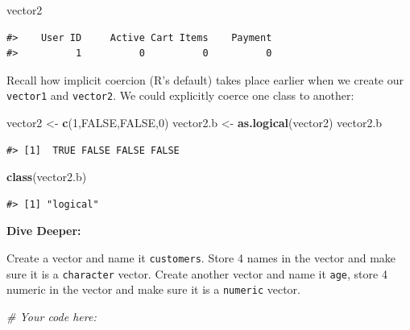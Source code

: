 \documentclass[]{article}
\newenvironment{Shaded}{\begin{snugshade}}{\end{snugshade}}
\newcommand{\CommentTok}[1]{\textcolor[rgb]{0.56,0.35,0.01}{\textit{#1}}}
\newcommand{\DecValTok}[1]{\textcolor[rgb]{0.00,0.00,0.81}{#1}}
\newcommand{\KeywordTok}[1]{\textcolor[rgb]{0.13,0.29,0.53}{\textbf{#1}}}
\newcommand{\NormalTok}[1]{#1}
\newcommand{\OtherTok}[1]{\textcolor[rgb]{0.56,0.35,0.01}{#1}}
\newcommand{\StringTok}[1]{\textcolor[rgb]{0.31,0.60,0.02}{#1}}
\begin{document}
\begin{Shaded}
\begin{Highlighting}[]
\NormalTok{vector2}
\end{Highlighting}
\end{Shaded}

\begin{verbatim}
#>    User ID     Active Cart Items    Payment 
#>          1          0          0          0
\end{verbatim}

Recall how implicit coercion (R's default) takes place earlier when we
create our \texttt{vector1} and \texttt{vector2}. We could explicitly
coerce one class to another:

\begin{Shaded}
\begin{Highlighting}[]
\NormalTok{vector2 <-}\StringTok{ }\KeywordTok{c}\NormalTok{(}\DecValTok{1}\NormalTok{,}\OtherTok{FALSE}\NormalTok{,}\OtherTok{FALSE}\NormalTok{,}\DecValTok{0}\NormalTok{)}
\NormalTok{vector2.b <-}\StringTok{ }\KeywordTok{as.logical}\NormalTok{(vector2)}
\NormalTok{vector2.b}
\end{Highlighting}
\end{Shaded}

\begin{verbatim}
#> [1]  TRUE FALSE FALSE FALSE
\end{verbatim}

\begin{Shaded}
\begin{Highlighting}[]
\KeywordTok{class}\NormalTok{(vector2.b)}
\end{Highlighting}
\end{Shaded}

\begin{verbatim}
#> [1] "logical"
\end{verbatim}

\textbf{Dive Deeper:}

Create a vector and name it \texttt{customers}. Store 4 names in the
vector and make sure it is a \texttt{character} vector. Create another
vector and name it \texttt{age}, store 4 numeric in the vector and make
sure it is a \texttt{numeric} vector.

\begin{Shaded}
\begin{Highlighting}[]
\CommentTok{# Your code here:}
\end{Highlighting}
\end{Shaded}
\end{document}
